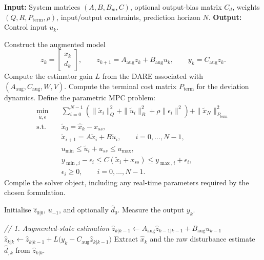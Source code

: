 \begin{algorithm}
	\caption{Offset-Free MPC with Disturbance Estimation}
	\label{alg:offset_free_mpc}
	\begin{algorithmic}[1]
		\State \textbf{Input:} System matrices \((A,B,B_w,C)\), optional output-bias matrix \(C_d\), weights \((Q,R,P_{\mathrm{term}},\rho)\), input/output constraints, prediction horizon \(N\).
		\State \textbf{Output:} Control input \(u_k\).
		
		\State Construct the augmented model
		\[
		z_k=
		\begin{bmatrix}
			x_k\\
			d_k
		\end{bmatrix},\qquad
		z_{k+1}=A_{\mathrm{aug}}z_k+B_{\mathrm{aug}}u_k,\qquad
		y_k=C_{\mathrm{aug}}z_k .
		\]
		\State Compute the estimator gain \(L\) from the DARE associated with \((A_{\mathrm{aug}},C_{\mathrm{aug}},W,V)\).
		\State Compute the terminal cost matrix \(P_{\mathrm{term}}\) for the deviation dynamics.
		\State Define the parametric MPC problem:
		\begin{align*}
			\min_{\tilde u,\epsilon}\quad
			&\sum_{i=0}^{N-1}
			\left(
			\|\tilde x_i\|_Q^2+\|\tilde u_i\|_R^2+\rho\|\epsilon_i\|^2
			\right)
			+\|\tilde x_N\|_{P_{\mathrm{term}}}^2 \\
			\text{s.t.}\quad
			&\tilde x_0=\hat x_k-x_{ss},\\
			&\tilde x_{i+1}=A\tilde x_i+B\tilde u_i,\qquad i=0,\dots,N-1,\\
			&u_{\min}\le \tilde u_i+u_{ss}\le u_{\max},\\
			&y_{\min,i}-\epsilon_i\le C(\tilde x_i+x_{ss})\le y_{\max,i}+\epsilon_i,\\
			&\epsilon_i\ge 0,\qquad i=0,\dots,N-1.
		\end{align*}
		\State Compile the solver object, including any real-time parameters required by the chosen formulation.
		\EndProcedure
		
		\State Initialise \(\hat z_{0|0}\), \(u_{-1}\), and optionally \(\hat d_{0}\).
		\State Measure the output \(y_k\).
		
		\State \textit{// 1. Augmented-state estimation}
		\State \(\hat z_{k|k-1}\gets A_{\mathrm{aug}}\hat z_{k-1|k-1}+B_{\mathrm{aug}}u_{k-1}\)
		\State \(\hat z_{k|k}\gets \hat z_{k|k-1}+L\bigl(y_k-C_{\mathrm{aug}}\hat z_{k|k-1}\bigr)\)
		\State Extract \(\hat x_k\) and the raw disturbance estimate \(\hat d_{,k}\) from \(\hat z_{k|k}\).
	

\end{algorithmic}
\end{algorithm}
